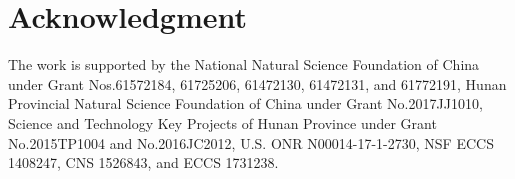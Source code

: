\documentclass[10pt,conference]{IEEEtran}
\begin{document}
\section*{Acknowledgment}
The work is supported  by the  National Natural Science Foundation of China under Grant Nos.61572184, 61725206, 61472130, 61472131, and 61772191,  Hunan Provincial Natural Science Foundation of China under Grant No.2017JJ1010,  Science and Technology Key Projects of Hunan Province under Grant No.2015TP1004 and No.2016JC2012,  U.S. ONR N00014-17-1-2730, NSF ECCS 1408247, CNS 1526843, and ECCS 1731238.


%


\end{document}

